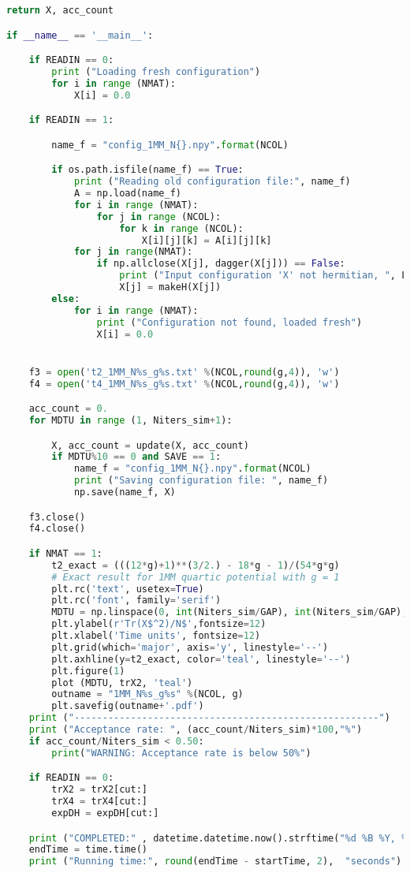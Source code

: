 \begin{lstlisting}[language=Python]
	return X, acc_count

if __name__ == '__main__':

	if READIN == 0:
		print ("Loading fresh configuration")
		for i in range (NMAT): 
			X[i] = 0.0  

	if READIN == 1:

		name_f = "config_1MM_N{}.npy".format(NCOL)

		if os.path.isfile(name_f) == True: 
			print ("Reading old configuration file:", name_f)
			A = np.load(name_f)
			for i in range (NMAT):
				for j in range (NCOL):
					for k in range (NCOL):
						X[i][j][k] = A[i][j][k]
			for j in range(NMAT):
				if np.allclose(X[j], dagger(X[j])) == False:
					print ("Input configuration 'X' not hermitian, ", LA.norm(X[j] - dagger(X[j])), "making it so")
					X[j] = makeH(X[j])
		else:
			for i in range (NMAT): 
				print ("Configuration not found, loaded fresh")
				X[i] = 0.0


	f3 = open('t2_1MM_N%s_g%s.txt' %(NCOL,round(g,4)), 'w')
	f4 = open('t4_1MM_N%s_g%s.txt' %(NCOL,round(g,4)), 'w')

	acc_count = 0.
	for MDTU in range (1, Niters_sim+1):

		X, acc_count = update(X, acc_count)
		if MDTU%10 == 0 and SAVE == 1:
			name_f = "config_1MM_N{}.npy".format(NCOL)
			print ("Saving configuration file: ", name_f)
			np.save(name_f, X)

	f3.close()
	f4.close()

	if NMAT == 1:  
		t2_exact = (((12*g)+1)**(3/2.) - 18*g - 1)/(54*g*g)
		# Exact result for 1MM quartic potential with g = 1
		plt.rc('text', usetex=True)
		plt.rc('font', family='serif')
		MDTU = np.linspace(0, int(Niters_sim/GAP), int(Niters_sim/GAP), endpoint=True)
		plt.ylabel(r'Tr(X$^2)/N$',fontsize=12)
		plt.xlabel('Time units', fontsize=12)
		plt.grid(which='major', axis='y', linestyle='--')
		plt.axhline(y=t2_exact, color='teal', linestyle='--')
		plt.figure(1)
		plot (MDTU, trX2, 'teal') 
		outname = "1MM_N%s_g%s" %(NCOL, g)
		plt.savefig(outname+'.pdf')
	print ("------------------------------------------------------")
	print ("Acceptance rate: ", (acc_count/Niters_sim)*100,"%") 
	if acc_count/Niters_sim < 0.50:
		print("WARNING: Acceptance rate is below 50%")

	if READIN == 0:
		trX2 = trX2[cut:]
		trX4 = trX4[cut:]
		expDH = expDH[cut:] 

	print ("COMPLETED:" , datetime.datetime.now().strftime("%d %B %Y, %H:%M:%S"))
	endTime = time.time() 
	print ("Running time:", round(endTime - startTime, 2),  "seconds")
\end{lstlisting}